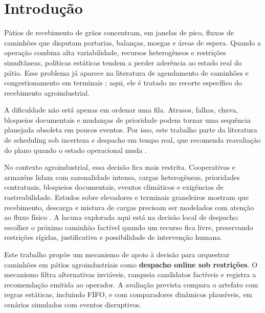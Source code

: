 \documentclass[
  12pt,
  oneside,
  a4paper,
  sumario=tradicional,
  brazil
]{abntex2}
\begin{document}
\listoffigures*
\cleardoublepage

\listoftables*
\cleardoublepage

\tableofcontents*
\cleardoublepage

\textual
\OnehalfSpacing

\chapter{Introdução}

P\'atios de recebimento de gr\~aos concentram, em janelas de pico, fluxos de caminh\~oes que disputam portarias, balan\c{c}as, moegas e \'areas de espera. Quando a opera\c{c}\~ao combina alta variabilidade, recursos heterog\^eneos e restri\c{c}\~oes simult\^aneas, pol\'iticas est\'aticas tendem a perder ader\^encia ao estado real do p\'atio. Esse problema j\'a aparece na literatura de agendamento de caminh\~oes e congestionamento em terminais \parencite{abdelmagidComprehensiveReviewTruck2022a, graciaTruckAppointmentScheduling2025a}; aqui, ele \'e tratado no recorte espec\'ifico do recebimento agroindustrial.

A dificuldade n\~ao est\'a apenas em ordenar uma fila. Atrasos, falhas, chuva, bloqueios documentais e mudan\c{c}as de prioridade podem tornar uma sequ\^encia planejada obsoleta em poucos eventos. Por isso, este trabalho parte da literatura de scheduling sob incerteza e despacho em tempo real, que recomenda reavalia\c{c}\~ao do plano quando o estado operacional muda \parencite{liProcessSchedulingUncertainty2008a, torbaliMultiagentbasedRealtimeTruck2023}.

No contexto agroindustrial, essa decis\~ao fica mais restrita. Cooperativas e armaz\'ens lidam com sazonalidade intensa, cargas heterog\^eneas, prioridades contratuais, bloqueios documentais, eventos clim\'aticos e exig\^encias de rastreabilidade. Estudos sobre elevadores e terminais graneleiros mostram que recebimento, descarga e mistura de cargas precisam ser modelados com aten\c{c}\~ao ao fluxo f\'isico \parencite{r.berrutoAnalyzingReceivingOperation2001a, turnerDiscreteEventSimulation2019a}. A lacuna explorada aqui est\'a na decis\~ao local de despacho: escolher o pr\'oximo caminh\~ao fact\'ivel quando um recurso fica livre, preservando restri\c{c}\~oes r\'igidas, justificativa e possibilidade de interven\c{c}\~ao humana.

Este trabalho prop\~oe um mecanismo de apoio \`a decis\~ao para orquestrar caminh\~oes em p\'atios agroindustriais como \textbf{despacho online sob restri\c{c}\~oes}. O mecanismo filtra alternativas invi\'aveis, ranqueia candidatos fact\'iveis e registra a recomenda\c{c}\~ao emitida ao operador. A avalia\c{c}\~ao prevista compara o artefato com regras est\'aticas, incluindo FIFO, e com comparadores din\^amicos plaus\'iveis, em cen\'arios simulados com eventos disruptivos.
\end{document}
